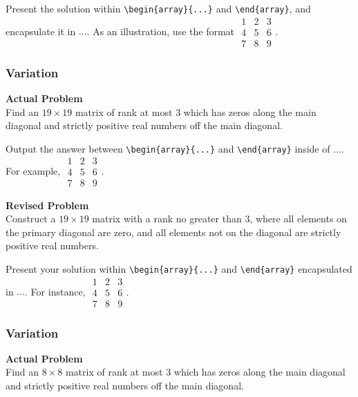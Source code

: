Present the solution within \verb|\begin{array}{...}| and \verb|\end{array}|, and encapsulate it in $\boxed{...}$. As an illustration, use the format $\boxed{\begin{array}{ccc}1 & 2 & 3 \\ 4 & 5 & 6 \\ 7 & 8 & 9\end{array}}$.

\subsubsection{Variation}
\textbf{Actual Problem}\\
Find an $19 \times 19$ matrix of rank at most 3 which has zeros along the main diagonal and strictly positive real numbers off the main diagonal.

Output the answer between \verb|\begin{array}{...}| and \verb|\end{array}| inside of $\boxed{...}$. For example, $\boxed{\begin{array}{ccc}1 & 2 & 3 \\ 4 & 5 & 6 \\ 7 & 8 & 9\end{array}}$.

\textbf{Revised Problem}\\
Construct a $19 \times 19$ matrix with a rank no greater than 3, where all elements on the primary diagonal are zero, and all elements not on the diagonal are strictly positive real numbers.

Present your solution within \verb|\begin{array}{...}| and \verb|\end{array}| encapsulated in $\boxed{...}$. For instance, $\boxed{\begin{array}{ccc}1 & 2 & 3 \\ 4 & 5 & 6 \\ 7 & 8 & 9\end{array}}$.

\subsubsection{Variation}
\textbf{Actual Problem}\\
Find an $8 \times 8$ matrix of rank at most 3 which has zeros along the main diagonal and strictly positive real numbers off the main diagonal.

